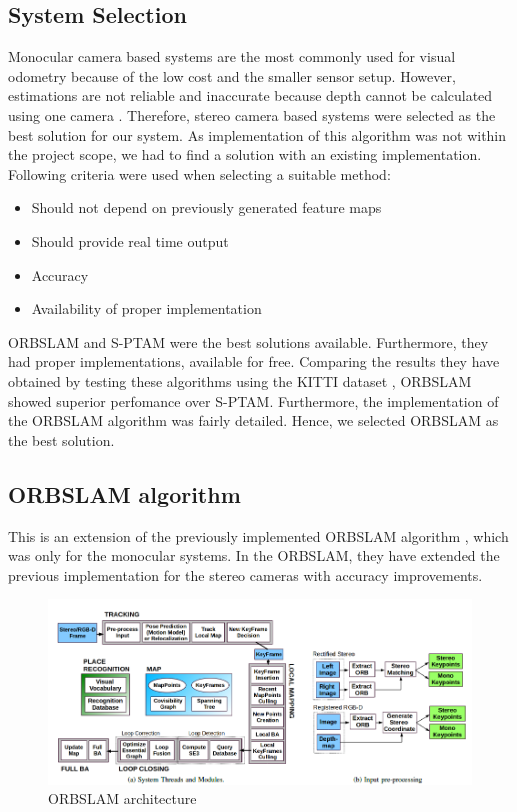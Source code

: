\subsection{System Selection}
\label{subsec:vodomSystemSelection}
Monocular camera based systems are the most commonly used for visual odometry because of the low cost and the smaller sensor setup. However, estimations are not reliable and inaccurate because depth cannot be calculated using one camera \cite{ra:ORB_SLAM2}. Therefore, stereo camera based systems were selected as the best solution for our system. As implementation of this algorithm was not within the project scope, we had to find a solution with an existing implementation. Following criteria were used when selecting a suitable method:
\begin{itemize}
    \item Should not depend on previously generated feature maps
    \item Should provide real time output
    \item Accuracy
    \item Availability of proper implementation
\end{itemize}

\gls{ORBSLAM} \cite{ra:ORB_SLAM2} and \gls{S-PTAM} \cite{ra:S-PTAM} were the best solutions available. Furthermore, they had proper implementations, available for free. Comparing the results they have obtained by testing these algorithms using the KITTI dataset \cite{ra:KITTI}, \gls{ORBSLAM} showed superior perfomance over \gls{S-PTAM}. Furthermore, the implementation of the \gls{ORBSLAM} algorithm was fairly detailed. Hence, we selected \gls{ORBSLAM} as the best solution.


\subsection{\gls{ORBSLAM} algorithm}
This is an extension of the previously implemented \gls{ORBSLAM} algorithm \cite{ra:ORB_SLAM}, which was only for the monocular systems. In the \gls{ORBSLAM}, they have extended the previous implementation for the stereo cameras with accuracy improvements\cite{ra:ORB_SLAM2}. 
\begin{figure}[t]
	\centering
	\includegraphics[width=\textwidth]{figs/ORB_SYSTEM.png}
	\vspace{-0.5cm}
	\caption{\gls{ORBSLAM} architecture \cite{ra:ORB_SLAM2}}
	\label{fig:ra:ORB_SYSTEM}
	\vspace{0.5cm}
\end{figure}


